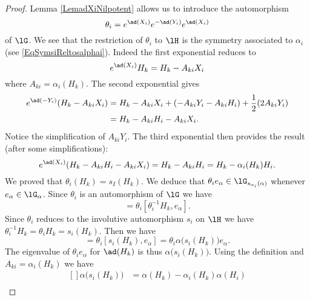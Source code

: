 \begin{proof}
    Lemma \ref{LemadXiNilpotent} allows us to introduce the automorphism
    \begin{equation}
        \theta_i= e^{\ad(X_i)} e^{-\ad(Y_i)} e^{\ad(X_i)}
    \end{equation}
    of \( \lG\). We see that the restriction of \( \theta_i\) to \( \lH\) is the symmetry associated to \( \alpha_i\) (see \eqref{EqSymsiReltosalphai}). Indeed the first exponential reduces to
    \begin{equation}
        e^{\ad(X_i)}H_k=H_k-A_{ki}X_i
    \end{equation}
    where \( A_{ki}=\alpha_i(H_k)\). The second exponential gives
    \begin{equation}
        \begin{aligned}[]
            e^{\ad(-Y_i)}(H_k-A_{ki}X_i)&=H_k-A_{ki}X_i+(-A_{ki}Y_i-A_{ki}H_i)+\frac{ 1 }{2}(2A_{ki}Y_i)\\
            &=H_k-A_{ki}H_i-A_{ki}X_i.
        \end{aligned}
    \end{equation}
    Notice the simplification of \( A_{ki}Y_i\). The third exponential then provides the result (after some simplifications):
    \begin{equation}
        e^{\ad(X_i)}(H_k-A_{ki}H_i-A_{ki}X_i)=H_k-A_{ki}H_i=H_k-\alpha_i(H_k)H_i.
    \end{equation}
    We proved that \( \theta_i(H_k)=s_I(H_k)\).  We deduce that \( \theta_ie_{\alpha}\in\lG_{s_{\alpha_i}(\alpha)}\) whenever \( e_{\alpha}\in\lG_{\alpha}\). Since \( \theta_i\) is an automorphism of \( \lG\) we have
    \begin{equation}
        [H_k,\theta_ie_{\alpha}]=\theta_i[\theta_i^{-1}H_k,e_{\alpha}].
    \end{equation}
    Since \( \theta_i\) reduces to the involutive automorphism \( s_i\) on \( \lH\) we have \( \theta_i^{-1}H_k=\theta_iH_k=s_i(H_k)\). Then we have
    \begin{equation}
        [H_k,\theta_ie_{\alpha}]=\theta_i[s_i(H_k),e_{\alpha}]=\theta_i\alpha\big( s_i(H_k) \big)e_{\alpha}.
    \end{equation}
    The eigenvalue of \( \theta_ie_{\alpha}\) for \( \ad(H_k)\) is thus \( \alpha\big( s_i(H_k) \big)\). Using the definition and \( A_{ki}=\alpha_i(H_k)\) we have
    \begin{equation}
        \begin{aligned}[]
            \alpha\big( s_i(H_k) \big)&=\alpha(H_k)-\alpha_i(H_k)\alpha(H_i)\\

\end{aligned}
\end{equation}
\end{proof}
